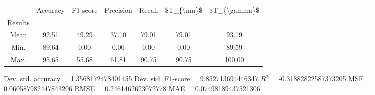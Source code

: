 \begin{tabular}{|c|c|c|c|c|c|c|}
\toprule
{} &  Accuracy &  F1 score &  Precision &  Recall &  \$T\_\{\textbackslash mu\}\$ &  \$T\_\{\textbackslash gamma\}\$ \\
Results &           &           &            &         &            &               \\
\hline
Mean    &     92.51 &     49.29 &      37.10 &   79.01 &      79.01 &         93.19 \\
Min.    &     89.64 &      0.00 &       0.00 &    0.00 &       0.00 &         89.59 \\
Max.    &     95.65 &     55.68 &      61.81 &   90.75 &      90.75 &        100.00 \\
\bottomrule
\end{tabular}

 Dev. std. accuracy = 1.3568172478401455
 Dev. std. F1-score = 9.852713694446347
 $R^2$ = -0.31882822587373205
 MSE = 0.060587982447843206
 RMSE = 0.2461462623072778
 MAE = 0.07498189437521306